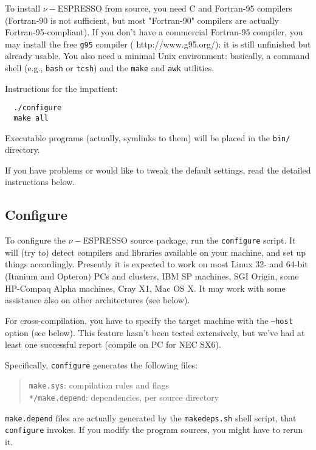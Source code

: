 \documentclass[12pt,a4paper]{article}
\begin{document}
To install $\nu-$ESPRESSO from source, you need C and Fortran-95
compilers (Fortran-90 is not sufficient, but most "Fortran-90"
compilers are actually Fortran-95-compliant).
If you don't have a commercial Fortran-95 compiler, you may install
the free \texttt{g95} compiler
(%
                   {http://www.g95.org/}):
it is still unfinished but already usable.
You also need a minimal Unix environment: basically, a command shell
(e.g., \texttt{bash} or \texttt{tcsh}) and the \texttt{make} and
\texttt{awk} utilities.

Instructions for the impatient:
\begin{verbatim}
  ./configure
  make all
\end{verbatim}
Executable programs (actually, symlinks to them) will be placed in the
\texttt{bin/} directory.

If you have problems or would like to tweak the default settings, read
the detailed instructions below.

\subsection{Configure}

To configure the $\nu-$ESPRESSO source package, run the \texttt{configure}
script.  It will (try to) detect compilers and libraries available on
your machine, and set up things accordingly.
Presently it is expected to work on most Linux 32- and 64-bit (Itanium
and Opteron) PCs and clusters, IBM SP machines, SGI Origin, some
HP-Compaq Alpha machines, Cray X1, Mac OS X.  It may work with some
assistance also on other architectures (see below).

For cross-compilation, you have to specify the target machine with the
\texttt{--host} option (see below).  This feature hasn't been tested
extensively, but we've had at least one successful report (compile on
PC for NEC SX6).

Specifically, \texttt{configure} generates the following files:
\begin{quote}
  \texttt{make.sys}: compilation rules and flags\\
  \texttt{*/make.depend}: dependencies, per source directory
\end{quote}

\texttt{make.depend} files are actually generated by the
\texttt{makedeps.sh} shell script, that \texttt{configure} invokes.
If you modify the program sources, you might have to rerun it.
\end{document}
